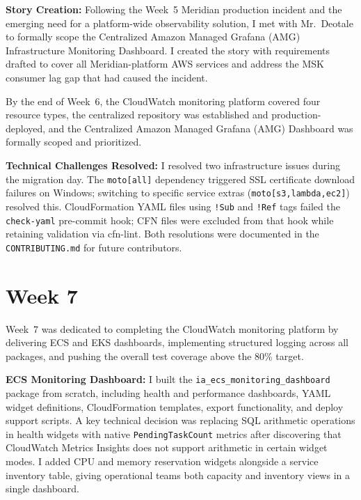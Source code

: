 \textbf{Story Creation:} 
Following the Week~5 Meridian production incident
and the emerging need for a platform-wide observability solution, I met
with Mr.\ Deotale to formally scope the Centralized Amazon Managed Grafana (AMG) Infrastructure Monitoring Dashboard. I created the story
with requirements drafted to cover all Meridian-platform AWS services
and address the MSK consumer lag gap that had caused the incident.

By the end of Week~6, the CloudWatch monitoring platform covered four
resource types, the centralized repository was established and
production-deployed, and the Centralized Amazon Managed Grafana (AMG) Dashboard was formally scoped and prioritized.

\textbf{Technical Challenges Resolved:} 
I resolved two infrastructure issues during the migration day. The \texttt{moto[all]} dependency
triggered SSL certificate download failures on Windows; switching to
specific service extras (\texttt{moto[s3,lambda,ec2]}) resolved this.
CloudFormation YAML files using \texttt{!Sub} and \texttt{!Ref} tags
failed the \texttt{check-yaml} pre-commit hook; CFN files were excluded
from that hook while retaining validation via cfn-lint. Both resolutions
were documented in the \texttt{CONTRIBUTING.md} for future contributors.


\FloatBarrier

\section{Week 7}
\label{sec:week7}

Week~7 was dedicated to completing the CloudWatch monitoring platform
by delivering ECS and EKS dashboards, implementing structured logging
across all packages, and pushing the overall test coverage above the
80\% target.

\textbf{ECS Monitoring Dashboard:} 
I built the \texttt{ia\_ecs\_monitoring\_dashboard}
package from scratch, including health and performance
dashboards, YAML widget definitions, CloudFormation templates, export
functionality, and deploy support scripts. A key technical decision was
replacing SQL arithmetic operations in health widgets with native
\texttt{PendingTaskCount} metrics after discovering that CloudWatch
Metrics Insights does not support arithmetic in certain widget modes.
I added CPU and memory reservation widgets alongside a
service inventory table, giving operational teams both capacity and
inventory views in a single dashboard.

